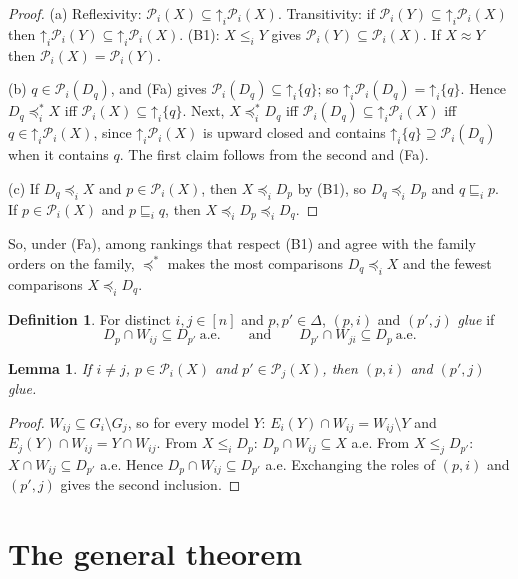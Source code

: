 \documentclass[11pt]{article}
\newtheorem{lemma}[theorem]{Lemma}
\theoremstyle{definition}
\newtheorem{definition}[theorem]{Definition}
\newcommand{\Pc}{\mathcal P}
\newcommand{\up}{\mathord{\uparrow}}
\newcommand{\ws}{\preceq^{*}}
\newcommand{\aev}{\ \text{a.e.}}
\begin{document}
\begin{proof}
(a) Reflexivity: $\Pc_i(X)\subseteq\up_i\Pc_i(X)$. Transitivity: if $\Pc_i(Y)\subseteq\up_i\Pc_i(X)$ then $\up_i\Pc_i(Y)\subseteq\up_i\Pc_i(X)$. (B1): $X\le_iY$ gives $\Pc_i(Y)\subseteq\Pc_i(X)$. If $X\approx Y$ then $\Pc_i(X)=\Pc_i(Y)$.

(b) $q\in\Pc_i(D_q)$, and (Fa) gives $\Pc_i(D_q)\subseteq\up_i\{q\}$; so $\up_i\Pc_i(D_q)=\up_i\{q\}$. Hence $D_q\ws_iX$ iff $\Pc_i(X)\subseteq\up_i\{q\}$. Next, $X\ws_iD_q$ iff $\Pc_i(D_q)\subseteq\up_i\Pc_i(X)$ iff $q\in\up_i\Pc_i(X)$, since $\up_i\Pc_i(X)$ is upward closed and contains $\up_i\{q\}\supseteq\Pc_i(D_q)$ when it contains $q$. The first claim follows from the second and (Fa).

(c) If $D_q\preceq_iX$ and $p\in\Pc_i(X)$, then $X\preceq_iD_p$ by (B1), so $D_q\preceq_iD_p$ and $q\sqsubseteq_ip$. If $p\in\Pc_i(X)$ and $p\sqsubseteq_iq$, then $X\preceq_iD_p\preceq_iD_q$.
\end{proof}

So, under (Fa), among rankings that respect (B1) and agree with the family orders on the family, $\ws$ makes the most comparisons $D_q\preceq_iX$ and the fewest comparisons $X\preceq_iD_q$.

\begin{definition}\label{def:glue}
For distinct $i,j\in[n]$ and $p,p'\in\Delta$, $(p,i)$ and $(p',j)$ \emph{glue} if
\[
D_p\cap W_{ij}\subseteq D_{p'}\aev\qquad\text{and}\qquad D_{p'}\cap W_{ji}\subseteq D_p\aev
\]
\end{definition}

\begin{lemma}\label{lem:glue}
If $i\ne j$, $p\in\Pc_i(X)$ and $p'\in\Pc_j(X)$, then $(p,i)$ and $(p',j)$ glue.
\end{lemma}

\begin{proof}
$W_{ij}\subseteq G_i\setminus G_j$, so for every model $Y$: $E_i(Y)\cap W_{ij}=W_{ij}\setminus Y$ and $E_j(Y)\cap W_{ij}=Y\cap W_{ij}$. From $X\le_iD_p$: $D_p\cap W_{ij}\subseteq X$ a.e. From $X\le_jD_{p'}$: $X\cap W_{ij}\subseteq D_{p'}$ a.e. Hence $D_p\cap W_{ij}\subseteq D_{p'}$ a.e. Exchanging the roles of $(p,i)$ and $(p',j)$ gives the second inclusion.
\end{proof}

\section{The general theorem}\label{sec:general}
\end{document}
